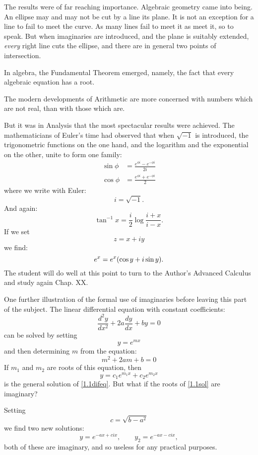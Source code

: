 The results were of far reaching importance. Algebraic geometry came into being. An ellipse may and may not be cut by a line its plane. It is not an exception for a line to fail to meet the curve. As many lines fail to meet it as meet it, so to speak. But when imaginaries are introduced, and the plane is suitably extended, \emph{every} right line cuts the ellipse, and there are in general two points of intersection. 

In algebra, the Fundamental Theorem emerged, namely, the fact that every algebraic equation has a root. 

The modern developments of Arithmetic are more concerned with numbers which are not real, than with those which are. 

But it was in Analysis that the most spectacular results were achieved. The mathematicians of Euler's time had observed that when $\sqrt{-1} $ is introduced, the trigonometric functions on the one hand, and the logarithm and the exponential on the other, unite to form one family:
\begin{align}
	\sin \phi &=\frac{e^{\phi i}-e^{-\phi i}}{2i} \\\label{cos,sin}
	\cos \phi &= \frac{e^{\phi i}+e^{-\phi i}}{2} 
\end{align} 
where we write with Euler:
\[
i=\sqrt{-1} 
.\] And again:
\[
\tan ^{-1}x=\frac{i}{2}\log \frac{i+x}{i-x} 
.\] If we set 
\[
z=x+iy 
\] we find:
\[
	e^{x}=e^x\pbr*{\cos y +i\sin y } 
.\] The student will do well at this point to turn to the Author's Advanced Calculus and study again Chap. XX.

One further illustration of the formal use of imaginaries before leaving this part of the subject. The linear differential equation with constant coefficients:
\begin{equation}\label{1.1difeq}
\frac{d^2y }{dx^2} +2a \frac{dy}{dx} +by =0
\end{equation} 
can be solved by setting 
\[
y=e^{mx}
\] and then determining $m$ from the equation:
\begin{equation}\label{1.1sol}
m^2+2am+b=0
\end{equation} If $m_1$ and $m_2$ are roots of this equation, then 
\[
y =c_1e^{m_1x}+c_2e^{m_2x}
\] is the general solution of \ref{1.1difeq}. But what if the roots of \ref{1.1sol} are imaginary? 

Setting 
\begin{equation}\label{1.1c}
c=\sqrt{b-a^2} 
\end{equation} we find two new solutions:
\[
y=e^{-ax+cix}, \qquad y_2=e^{-ax-cix}
,\] both of these are imaginary, and so useless for any practical purposes. 

